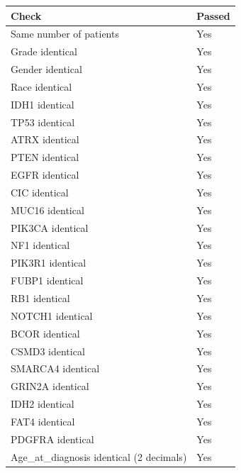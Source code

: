 \begin{tabular}{ll}
\toprule
\textbf{Check} & \textbf{Passed} \\
\midrule
Same number of patients & Yes \\
Grade identical & Yes \\
Gender identical & Yes \\
Race identical & Yes \\
IDH1 identical & Yes \\
TP53 identical & Yes \\
ATRX identical & Yes \\
PTEN identical & Yes \\
EGFR identical & Yes \\
CIC identical & Yes \\
MUC16 identical & Yes \\
PIK3CA identical & Yes \\
NF1 identical & Yes \\
PIK3R1 identical & Yes \\
FUBP1 identical & Yes \\
RB1 identical & Yes \\
NOTCH1 identical & Yes \\
BCOR identical & Yes \\
CSMD3 identical & Yes \\
SMARCA4 identical & Yes \\
GRIN2A identical & Yes \\
IDH2 identical & Yes \\
FAT4 identical & Yes \\
PDGFRA identical & Yes \\
Age\_at\_diagnosis identical (2 decimals) & Yes \\
\bottomrule
\end{tabular}

